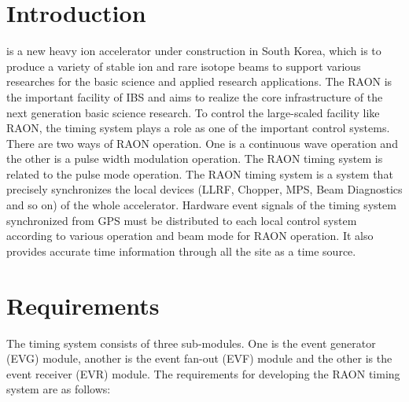 \documentclass[journal,reqno]{IEEEtran}
\begin{document}
\section{Introduction}
% 
% 
% 
% 

 is a new heavy ion accelerator under construction in South Korea, which is to produce a variety of stable ion and rare isotope beams to support various researches for the basic science and applied research applications\cite{risp}. The RAON is the important facility of IBS and aims to realize the core infrastructure of the next generation basic science research. To control the large-scaled facility like RAON, the timing system plays a role as one of the important control systems. There are two ways of RAON operation. One is a continuous wave operation and the other is a pulse width modulation operation. The RAON timing system is related to the pulse mode operation. The RAON timing system is a system that precisely synchronizes the local devices (LLRF, Chopper, MPS, Beam Diagnostics and so on) of the whole accelerator. Hardware event signals of the timing system synchronized from GPS must be distributed to each local control system according to various operation and beam mode for RAON operation. It also provides accurate time information through all the site as a time source.

\section{Requirements}
The timing system consists of three sub-modules. One is the event generator (EVG) module, another is the event fan-out (EVF) module and the other is the event receiver (EVR) module.
The requirements for developing the RAON timing system are as follows:
\end{document}

